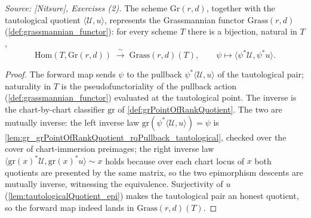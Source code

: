 \begin{theorem}\leanok
  \label{thm:grassmannian_universal_property}
  \textit{Source: [Nitsure], Exercises (2).}
  The scheme \(\mathrm{Gr}(r,d)\), together with the tautological quotient
  \(\langle \mathcal{U}, u\rangle\), represents the Grassmannian functor
  \(\mathrm{Grass}(r,d)\) (\cref{def:grassmannian_functor}): for every scheme \(T\) there is a
  bijection, natural in \(T\),
  \[
    \mathrm{Hom}(T, \mathrm{Gr}(r,d)) \;\xrightarrow{\ \sim\ }\; \mathrm{Grass}(r,d)(T),
    \qquad \psi \longmapsto \langle \psi^{*}\mathcal{U}, \psi^{*}u\rangle .
  \]
\end{theorem}
\begin{proof}
  The forward map sends \(\psi\) to the pullback \(\psi^{*}\langle\mathcal{U},u\rangle\) of the
  tautological pair; naturality in \(T\) is the pseudofunctoriality of the pullback action
  (\cref{def:grassmannian_functor}) evaluated at the tautological point. The inverse is the
  chart-by-chart classifier \(\mathrm{gr}\) of \cref{def:grPointOfRankQuotient}. The two are
  mutually inverse: the left inverse law
  \(\mathrm{gr}(\psi^{*}\langle\mathcal{U},u\rangle) = \psi\) is
  \cref{lem:gr_grPointOfRankQuotient_rqPullback_tautological}, checked over the cover of
  chart-immersion preimages; the right inverse law
  \(\langle\mathrm{gr}(x)^{*}\mathcal{U}, \mathrm{gr}(x)^{*}u\rangle \sim x\) holds because over
  each chart locus of \(x\) both quotients are presented by the same matrix, so the two
  epimorphism descents are mutually inverse, witnessing the equivalence. Surjectivity of \(u\)
  (\cref{lem:tautologicalQuotient_epi}) makes the tautological pair an honest quotient, so the
  forward map indeed lands in \(\mathrm{Grass}(r,d)(T)\).
\end{proof}

